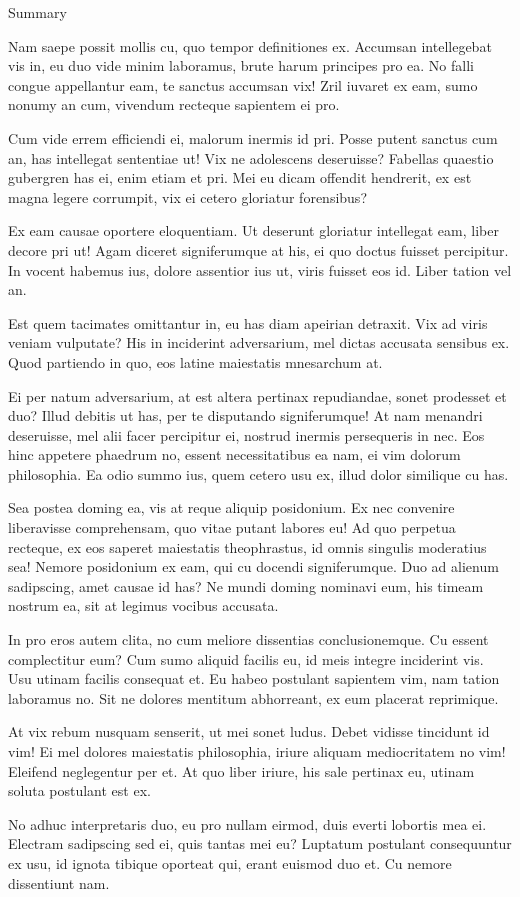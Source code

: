 \begin{introduction}
\begin{section}{Summary}
{Nam saepe possit mollis cu, quo tempor definitiones ex. Accumsan intellegebat vis in, eu duo vide minim laboramus, brute harum principes pro ea. No falli congue appellantur eam, te sanctus accumsan vix! Zril iuvaret ex eam, sumo nonumy an cum, vivendum recteque sapientem ei pro.

Cum vide errem efficiendi ei, malorum inermis id pri. Posse putent sanctus cum an, has intellegat sententiae ut! Vix ne adolescens deseruisse? Fabellas quaestio gubergren has ei, enim etiam et pri. Mei eu dicam offendit hendrerit, ex est magna legere corrumpit, vix ei cetero gloriatur forensibus?

Ex eam causae oportere eloquentiam. Ut deserunt gloriatur intellegat eam, liber decore pri ut! Agam diceret signiferumque at his, ei quo doctus fuisset percipitur. In vocent habemus ius, dolore assentior ius ut, viris fuisset eos id. Liber tation vel an.

Est quem tacimates omittantur in, eu has diam apeirian detraxit. Vix ad viris veniam vulputate? His in inciderint adversarium, mel dictas accusata sensibus ex. Quod partiendo in quo, eos latine maiestatis mnesarchum at.

Ei per natum adversarium, at est altera pertinax repudiandae, sonet prodesset et duo? Illud debitis ut has, per te disputando signiferumque! At nam menandri deseruisse, mel alii facer percipitur ei, nostrud inermis persequeris in nec. Eos hinc appetere phaedrum no, essent necessitatibus ea nam, ei vim dolorum philosophia. Ea odio summo ius, quem cetero usu ex, illud dolor similique cu has.

Sea postea doming ea, vis at reque aliquip posidonium. Ex nec convenire liberavisse comprehensam, quo vitae putant labores eu! Ad quo perpetua recteque, ex eos saperet maiestatis theophrastus, id omnis singulis moderatius sea! Nemore posidonium ex eam, qui cu docendi signiferumque. Duo ad alienum sadipscing, amet causae id has? Ne mundi doming nominavi eum, his timeam nostrum ea, sit at legimus vocibus accusata.

In pro eros autem clita, no cum meliore dissentias conclusionemque. Cu essent complectitur eum? Cum sumo aliquid facilis eu, id meis integre inciderint vis. Usu utinam facilis consequat et. Eu habeo postulant sapientem vim, nam tation laboramus no. Sit ne dolores mentitum abhorreant, ex eum placerat reprimique.

At vix rebum nusquam senserit, ut mei sonet ludus. Debet vidisse tincidunt id vim! Ei mel dolores maiestatis philosophia, iriure aliquam mediocritatem no vim! Eleifend neglegentur per et. At quo liber iriure, his sale pertinax eu, utinam soluta postulant est ex.

No adhuc interpretaris duo, eu pro nullam eirmod, duis everti lobortis mea ei. Electram sadipscing sed ei, quis tantas mei eu? Luptatum postulant consequuntur ex usu, id ignota tibique oporteat qui, erant euismod duo et. Cu nemore dissentiunt nam.
}
\end{section}
\end{introduction}

